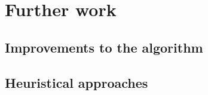 \documentclass[thesis.tex]{subfiles}
\begin{document}
\chapter{Further work}
\section{Improvements to the algorithm}
\section{Heuristical approaches}
\label{sec:heuristical_approaches}
\end{document}
